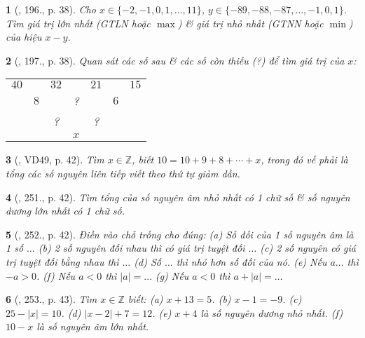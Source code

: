 \documentclass{article}
\newtheorem{baitoan}{}
\begin{document}
\begin{baitoan}[\cite{Tuyen_Toan_6}, 196., p. 38]
	Cho $x\in\{-2,-1,0,1,\ldots,11\}$, $y\in\{-89,-88,-87,\ldots,-1,0,1\}$. Tìm giá trị lớn nhất (GTLN hoặc $\max$) \& giá trị nhỏ nhất (GTNN hoặc $\min$) của hiệu $x - y$.
\end{baitoan}

\begin{baitoan}[\cite{Tuyen_Toan_6}, 197., p. 38]
	Quan sát các số sau \& các số còn thiếu (?) để tìm giá trị của $x$:
	\begin{table}[H]
		\centering
		\begin{tabular}{ccccccc}
			$40$ &  & $32$ &  & $21$ &  &  $15$ \\
			& $8$ &  & ? &  & $6$ &  \\
			&  & ? &  & ? &  &  \\
			&  &  & $x$ &  &  &  \\
		\end{tabular}
	\end{table}
\end{baitoan}

\begin{baitoan}[\cite{Binh_Toan_6_tap_1}, VD49, p. 42]
	Tìm $x\in\mathbb{Z}$, biết $10 = 10 + 9 + 8 + \cdots + x$, trong đó vế phải là tổng các số nguyên liên tiếp viết theo thứ tự giảm dần.
\end{baitoan}

\begin{baitoan}[\cite{Binh_Toan_6_tap_1}, 251., p. 42]
	Tìm tổng của số nguyên âm nhỏ nhất có 1 chữ số \& số nguyên dương lớn nhất có 1 chữ số.
\end{baitoan}

\begin{baitoan}[\cite{Binh_Toan_6_tap_1}, 252., p. 42]
	Điền vào chỗ trống cho đúng: (a) Số đối của 1 số nguyên âm là 1 số $\ldots$ (b) 2 số nguyên đối nhau thì có giá trị tuyệt đối $\ldots$ (c) 2 số nguyên có giá trị tuyệt đối bằng nhau thì $\ldots$ (d) Số $\ldots$ thì nhỏ hơn số đối của nó. (e) Nếu $a\ldots$ thì $-a > 0$. (f) Nếu $a < 0$ thì $|a| = \ldots$ (g) Nếu $a < 0$ thì $a + |a| = \ldots$
\end{baitoan}

\begin{baitoan}[\cite{Binh_Toan_6_tap_1}, 253., p. 43]
	Tìm $x\in\mathbb{Z}$ biết: (a) $x + 13 = 5$. (b) $x - 1 = -9$. (c) $25 - |x| = 10$. (d) $|x - 2| + 7 = 12$. (e) $x + 4$ là số nguyên dương nhỏ nhất. (f) $10 - x$ là số nguyên âm lớn nhất.
\end{baitoan}
\end{document}
